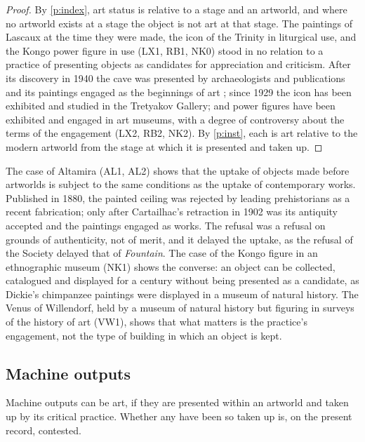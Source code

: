 \documentclass{situationist-preprint}
\begin{document}
\begin{proof}
By \ref{p:index}, art status is relative to a stage and an artworld, and where no artworld exists at a stage the object is not art at that stage. The paintings of Lascaux at the time they were made, the icon of the Trinity in liturgical use, and the Kongo power figure in use (LX1, RB1, NK0) stood in no relation to a practice of presenting objects as candidates for appreciation and criticism. After its discovery in 1940 the cave was presented by archaeologists and publications and its paintings engaged as the beginnings of art \citep{Bataille1955}; since 1929 the icon has been exhibited and studied in the Tretyakov Gallery; and power figures have been exhibited and engaged in art museums, with a degree of controversy about the terms of the engagement \citep{Rubin1984,McEvilley1984} (LX2, RB2, NK2). By \ref{p:inst}, each is art relative to the modern artworld from the stage at which it is presented and taken up.
\end{proof}

The case of Altamira (AL1, AL2) shows that the uptake of objects made before artworlds is subject to the same conditions as the uptake of contemporary works. Published in 1880, the painted ceiling was rejected by leading prehistorians as a recent fabrication; only after Cartailhac's retraction in 1902 \citep{Cartailhac1902} was its antiquity accepted and the paintings engaged as works. The refusal was a refusal on grounds of authenticity, not of merit, and it delayed the uptake, as the refusal of the Society delayed that of \emph{Fountain}. The case of the Kongo figure in an ethnographic museum (NK1) shows the converse: an object can be collected, catalogued and displayed for a century without being presented as a candidate, as Dickie's chimpanzee paintings were displayed in a museum of natural history. The Venus of Willendorf, held by a museum of natural history but figuring in surveys of the history of art (VW1), shows that what matters is the practice's engagement, not the type of building in which an object is kept.

\subsection{Machine outputs}

\begin{proposition}\label{p:machine}
Machine outputs can be art, if they are presented within an artworld and taken up by its critical practice. Whether any have been so taken up is, on the present record, contested.
\end{proposition}
\end{document}
